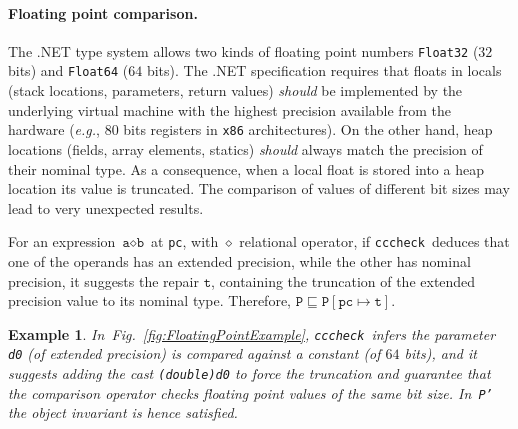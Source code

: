 \documentclass[10pt]{sigplanconf}
\newtheorem{example}{Example}
\newcommand{\refFig}[1]{Fig.~\ref{fig:#1}}
\newcommand{\code}[1]{\texttt{#1}}
\newcommand{\clousot}{\code{cccheck}}
\begin{document}
\paragraph{Floating point comparison.}
The .NET type system allows two kinds of floating point numbers
\code{Float32} ($32$ bits) and \code{Float64} ($64$ bits).  The .NET
specification requires that floats in locals (stack locations,
parameters, return values) \emph{should} be implemented by the
underlying virtual machine with the highest precision available from
the hardware (\emph{e.g.}, $80$ bits registers in \code{x86}
architectures).  On the other hand, heap locations (fields, array
elements, statics) \emph{should} always match the precision of their
nominal type.  As a consequence, when a local float is stored into a
heap location its value is truncated.  The comparison of values of
different bit sizes may lead to very unexpected results.

For an expression $\code{a} \diamond \code{b}$ at \code{pc}, with
$\diamond$ relational operator, if \clousot\ deduces that one of the
operands has an extended precision, while the other has nominal
precision, it suggests the repair $\code{t}$, containing the
truncation of the extended precision value to its nominal type.
Therefore, $\code{P} \sqsubseteq \code{P}[\code{pc} \mapsto
\code{t}]$.

\begin{example}\normalfont
In~\refFig{FloatingPointExample}, \clousot\ infers the parameter
\code{d0} (of extended precision) is compared against a constant (of
$64$ bits), and it suggests adding the cast \code{(double)d0} to force
the truncation and guarantee that the comparison operator checks
floating point values of the same bit size. In~\code{P'} the object
invariant is hence satisfied.
\end{example}
\end{document}
